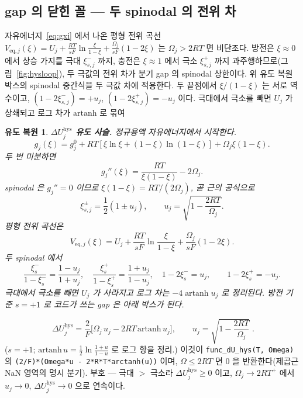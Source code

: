 \documentclass[11pt,a4paper]{article}
\newtheorem*{derivebox}{유도 복원}
\newcommand{\eq}{\mathrm{eq}}
\newcommand{\hys}{\mathrm{hys}}
\newcommand{\code}[1]{\texttt{#1}}
\begin{document}
\subsection{gap 의 닫힌 꼴 — 두 spinodal 의 전위 차}
자유에너지~\eqref{eq:gxi} 에서 나온 평형 전위 곡선
$V_{\eq,j}(\xi)=U_j+\frac{RT}{sF}\ln\frac{\xi}{1-\xi}+\frac{\Omega_j}{sF}(1-2\xi)$ 는 $\Omega_j>2RT$ 면
비단조다. 방전은 $\xi\!\approx\!0$ 에서 상승 가지를 극대 $\xi_{s,j}^-$ 까지, 충전은 $\xi\!\approx\!1$ 에서 극소 $\xi_{s,j}^+$
까지 과주행하므로(그림~\ref{fig:hysloop}), 두 극값의 전위 차가 분기 gap 의 spinodal 상한이다.
위 유도 복원 박스의 spinodal 중간식을 두 극값 차에 적용한다. 두 끝점에서
$\xi/(1-\xi)$ 는 서로 역수이고, $(1-2\xi_{s,j}^-)=+u_j$, $(1-2\xi_{s,j}^+)=-u_j$ 이다. 극대에서 극소를 빼면 $U_j$ 가 상쇄되고 로그 차가 $\mathrm{artanh}$ 로 묶여

\begin{derivebox}
\textbf{$\Delta U_j^{\hys}$ 유도 사슬.} 정규용액 자유에너지에서 시작한다.
\begin{equation*}
g_j(\xi)=g_j^0+RT[\xi\ln\xi+(1-\xi)\ln(1-\xi)]+\Omega_j\xi(1-\xi).
\end{equation*}
두 번 미분하면
\begin{equation*}
g_j''(\xi)=\frac{RT}{\xi(1-\xi)}-2\Omega_j.
\end{equation*}
spinodal 은 $g_j''=0$ 이므로 $\xi(1-\xi)=RT/(2\Omega_j)$, 곧 근의 공식으로
\begin{equation*}
\xi_{s,j}^{\pm}=\frac12(1\pm u_j),\qquad u_j=\sqrt{1-\frac{2RT}{\Omega_j}}.
\end{equation*}
평형 전위 곡선은
\begin{equation*}
V_{\eq,j}(\xi)=U_j+\frac{RT}{sF}\ln\frac{\xi}{1-\xi}+\frac{\Omega_j}{sF}(1-2\xi).
\end{equation*}
두 spinodal 에서
\begin{equation*}
\frac{\xi_s^-}{1-\xi_s^-}=\frac{1-u_j}{1+u_j},\quad
\frac{\xi_s^+}{1-\xi_s^+}=\frac{1+u_j}{1-u_j},\quad
1-2\xi_s^-=u_j,\qquad 1-2\xi_s^+=-u_j.
\end{equation*}
극대에서 극소를 빼면 $U_j$ 가 사라지고 로그 차는 $-4\operatorname{artanh}u_j$ 로 정리된다. 방전 기준 $s=+1$ 로 코드가 쓰는 gap 은 아래 박스가 된다.
\end{derivebox}

\begin{equation}
\boxed{\;\Delta U_j^\hys
=\frac{2}{F}\Big[\Omega_j\,u_j-2RT\,\mathrm{artanh}\,u_j\Big],
\qquad u_j=\sqrt{1-\frac{2RT}{\Omega_j}}\;.}
\label{eq:dUhys}
\end{equation}
($s=+1$; $\mathrm{artanh}\,u=\tfrac12\ln\tfrac{1+u}{1-u}$ 로 로그 항을 정리.) 이것이 \code{func\_dU\_hys(T, Omega)} 의
\code{(2/F)*(Omega*u - 2*R*T*arctanh(u))} 이며, $\Omega\le2RT$ 면 $0$ 을 반환한다(제곱근 NaN 영역의 명시 분기).
부호 — 극대 $>$ 극소라 $\Delta U_j^\hys\ge0$ 이고, $\Omega_j\to2RT^+$ 에서 $u_j\to0$, $\Delta U_j^\hys\to0$ 으로
연속이다.
\end{document}
